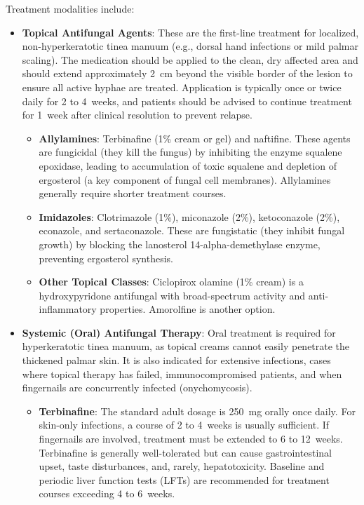 Treatment modalities include:
\begin{itemize}
    \item \textbf{Topical Antifungal Agents}: These are the first-line treatment for localized, non-hyperkeratotic tinea manuum (e.g., dorsal hand infections or mild palmar scaling). The medication should be applied to the clean, dry affected area and should extend approximately 2~cm beyond the visible border of the lesion to ensure all active hyphae are treated. Application is typically once or twice daily for 2 to 4~weeks, and patients should be advised to continue treatment for 1~week after clinical resolution to prevent relapse.
    \begin{itemize}
        \item \textbf{Allylamines}: Terbinafine (1\% cream or gel) and naftifine. These agents are fungicidal (they kill the fungus) by inhibiting the enzyme squalene epoxidase, leading to accumulation of toxic squalene and depletion of ergosterol (a key component of fungal cell membranes). Allylamines generally require shorter treatment courses.
        \item \textbf{Imidazoles}: Clotrimazole (1\%), miconazole (2\%), ketoconazole (2\%), econazole, and sertaconazole. These are fungistatic (they inhibit fungal growth) by blocking the lanosterol 14-alpha-demethylase enzyme, preventing ergosterol synthesis.
        \item \textbf{Other Topical Classes}: Ciclopirox olamine (1\% cream) is a hydroxypyridone antifungal with broad-spectrum activity and anti-inflammatory properties. Amorolfine is another option.
    \end{itemize}
    \item \textbf{Systemic (Oral) Antifungal Therapy}: Oral treatment is required for hyperkeratotic tinea manuum, as topical creams cannot easily penetrate the thickened palmar skin. It is also indicated for extensive infections, cases where topical therapy has failed, immunocompromised patients, and when fingernails are concurrently infected (onychomycosis).
    \begin{itemize}
        \item \textbf{Terbinafine}: The standard adult dosage is 250~mg orally once daily. For skin-only infections, a course of 2 to 4~weeks is usually sufficient. If fingernails are involved, treatment must be extended to 6 to 12~weeks. Terbinafine is generally well-tolerated but can cause gastrointestinal upset, taste disturbances, and, rarely, hepatotoxicity. Baseline and periodic liver function tests (LFTs) are recommended for treatment courses exceeding 4 to 6~weeks.

\end{itemize}
\end{itemize}
